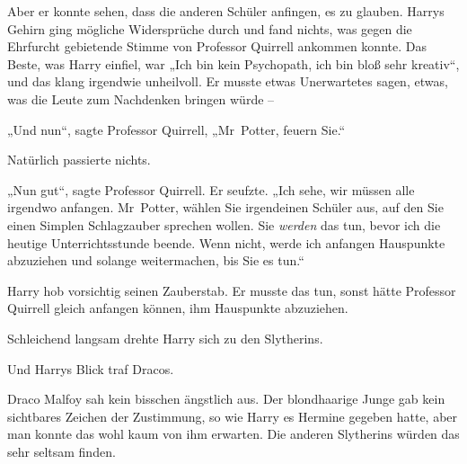 Aber er konnte sehen, dass die anderen Schüler anfingen, es zu glauben. Harrys Gehirn ging mögliche Widersprüche durch und fand nichts, was gegen die Ehrfurcht gebietende Stimme von Professor Quirrell ankommen konnte. Das Beste, was Harry einfiel, war „Ich bin kein Psychopath, ich bin bloß sehr kreativ“, und das klang irgendwie unheilvoll. Er musste etwas Unerwartetes sagen, etwas, was die Leute zum Nachdenken bringen würde –

„Und nun“, sagte Professor Quirrell, „Mr~Potter, feuern Sie.“

Natürlich passierte nichts.

„Nun gut“, sagte Professor Quirrell. Er seufzte. „Ich sehe, wir müssen alle irgendwo anfangen. Mr~Potter, wählen Sie irgendeinen Schüler aus, auf den Sie einen Simplen Schlagzauber sprechen wollen. Sie \emph{werden} das tun, bevor ich die heutige Unterrichtsstunde beende. Wenn nicht, werde ich anfangen Hauspunkte abzuziehen und solange weitermachen, bis Sie es tun.“

Harry hob vorsichtig seinen Zauberstab. Er musste das tun, sonst hätte Professor Quirrell gleich anfangen können, ihm Hauspunkte abzuziehen.

Schleichend langsam drehte Harry sich zu den Slytherins.

Und Harrys Blick traf Dracos.

Draco Malfoy sah kein bisschen ängstlich aus. Der blondhaarige Junge gab kein sichtbares Zeichen der Zustimmung, so wie Harry es Hermine gegeben hatte, aber man konnte das wohl kaum von ihm erwarten. Die anderen Slytherins würden das sehr seltsam finden.

